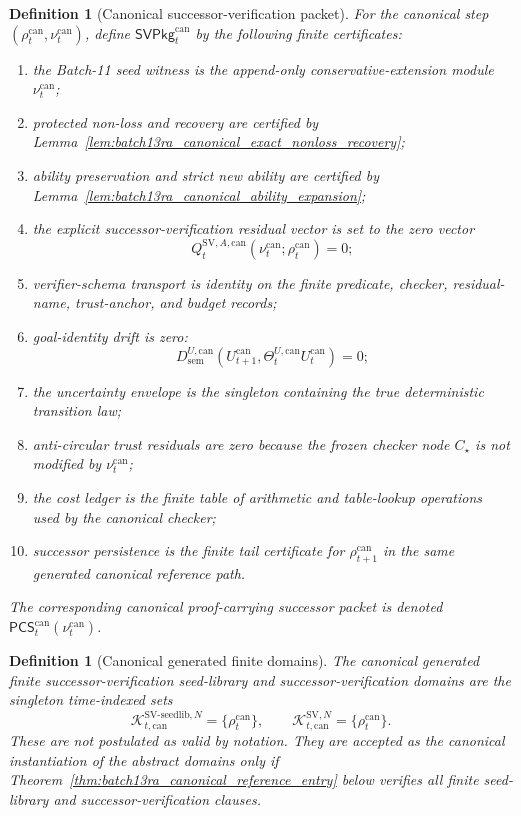 \documentclass[11pt]{article}
\newtheorem{definition}[theorem]{Definition}
\newcommand{\1}{\mathbf{1}}
\providecommand{\Kcal}{\mathcal{K}}
\providecommand{\sem}{\mathrm{sem}}
\begin{document}
\begin{definition}[Canonical successor-verification packet]
\label{def:batch13ra_canonical_sv_packet}
For the canonical step \((\rho_t^{\mathrm{can}},\nu_t^{\mathrm{can}})\), define \(\mathsf{SVPkg}_t^{\mathrm{can}}\) by the following finite certificates:
\begin{enumerate}[label=(\roman*),leftmargin=1.5em]
    \item the Batch-11 seed witness is the append-only conservative-extension module \(\nu_t^{\mathrm{can}}\);
    \item protected non-loss and recovery are certified by Lemma~\ref{lem:batch13ra_canonical_exact_nonloss_recovery};
    \item ability preservation and strict new ability are certified by Lemma~\ref{lem:batch13ra_canonical_ability_expansion};
    \item the explicit successor-verification residual vector is set to the zero vector
    \[
    Q_t^{\mathrm{SV},A,\mathrm{can}}(\nu_t^{\mathrm{can}};\rho_t^{\mathrm{can}})=0;
    \]
    \item verifier-schema transport is identity on the finite predicate, checker, residual-name, trust-anchor, and budget records;
    \item goal-identity drift is zero:
    \[
    D_{\sem}^{U,\mathrm{can}}(U_{t+1}^{\mathrm{can}},\Theta_t^{U,\mathrm{can}}U_t^{\mathrm{can}})=0;
    \]
    \item the uncertainty envelope is the singleton containing the true deterministic transition law;
    \item anti-circular trust residuals are zero because the frozen checker node \(C_\star\) is not modified by \(\nu_t^{\mathrm{can}}\);
    \item the cost ledger is the finite table of arithmetic and table-lookup operations used by the canonical checker;
    \item successor persistence is the finite tail certificate for \(\rho_{t+1}^{\mathrm{can}}\) in the same generated canonical reference path.
\end{enumerate}
The corresponding canonical proof-carrying successor packet is denoted \(\mathsf{PCS}_t^{\mathrm{can}}(\nu_t^{\mathrm{can}})\).
\end{definition}

\begin{definition}[Canonical generated finite domains]
\label{def:batch13ra_canonical_generated_domains}
The canonical generated finite successor-verification seed-library and successor-verification domains are the singleton time-indexed sets
\[
\Kcal_{t,\mathrm{can}}^{\mathrm{SV\mbox{-}seedlib},N}
=
\{\rho_t^{\mathrm{can}}\},
\qquad
\Kcal_{t,\mathrm{can}}^{\mathrm{SV},N}
=
\{\rho_t^{\mathrm{can}}\}.
\]
These are not postulated as valid by notation.  They are accepted as the canonical instantiation of the abstract domains only if Theorem~\ref{thm:batch13ra_canonical_reference_entry} below verifies all finite seed-library and successor-verification clauses.
\end{definition}
\end{document}
